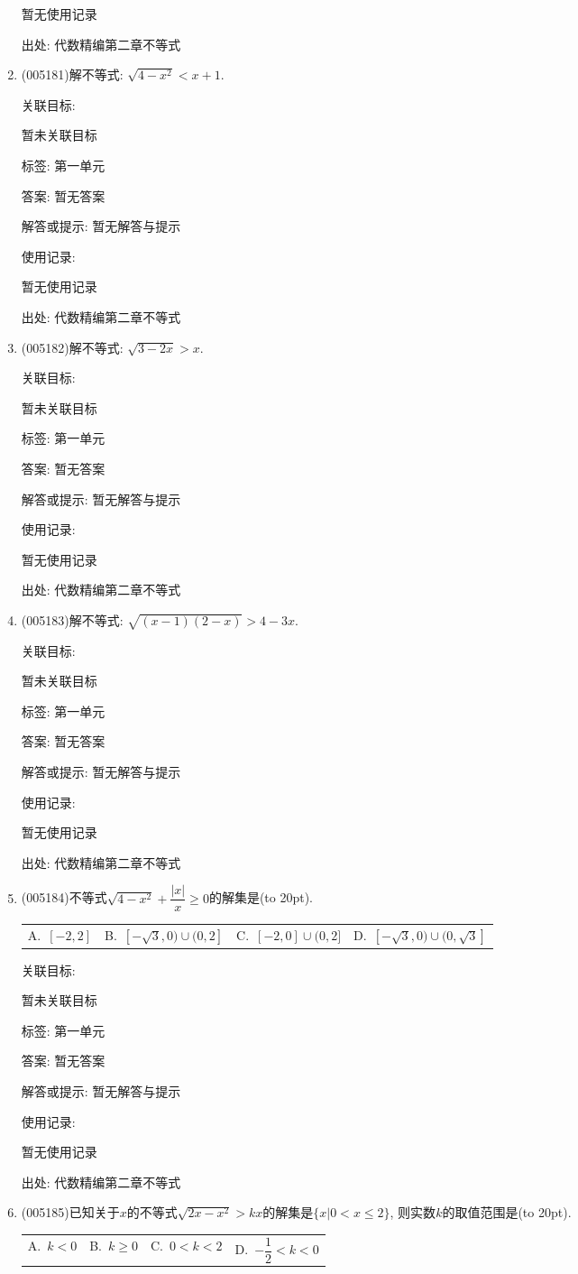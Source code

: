 \documentclass[10pt,a4paper]{article}
\newcommand{\bracket}[1]{(\hbox to #1pt{})}
\newcommand{\fourch}[4]{\par\begin{tabular}{p{.23\textwidth}p{.23\textwidth}p{.23\textwidth}p{.23\textwidth}}
A.~#1 &B.~#2& C.~#3& D.~#4
\end{tabular}}
\begin{document}
\begin{enumerate}[1.]
暂无使用记录


出处: 代数精编第二章不等式
\item { (005181)}解不等式: $\sqrt{4-x^2}<x+1$.


关联目标:

暂未关联目标



标签: 第一单元

答案: 暂无答案

解答或提示: 暂无解答与提示

使用记录:

暂无使用记录


出处: 代数精编第二章不等式
\item { (005182)}解不等式: $\sqrt{3-2x}>x$.


关联目标:

暂未关联目标



标签: 第一单元

答案: 暂无答案

解答或提示: 暂无解答与提示

使用记录:

暂无使用记录


出处: 代数精编第二章不等式
\item { (005183)}解不等式: $\sqrt{(x-1)(2-x)}>4-3x$.


关联目标:

暂未关联目标



标签: 第一单元

答案: 暂无答案

解答或提示: 暂无解答与提示

使用记录:

暂无使用记录


出处: 代数精编第二章不等式
\item { (005184)}不等式$\sqrt{4-x^2}+\dfrac{|x|}x\ge 0$的解集是\bracket{20}.
\fourch{$[-2,2]$}{$[-\sqrt 3,0)\cup (0,2]$}{$[-2,0]\cup (0,2]$}{$[-\sqrt 3,0)\cup (0,\sqrt 3]$}


关联目标:

暂未关联目标



标签: 第一单元

答案: 暂无答案

解答或提示: 暂无解答与提示

使用记录:

暂无使用记录


出处: 代数精编第二章不等式
\item { (005185)}已知关于$x$的不等式$\sqrt{2x-x^2}>kx$的解集是$\{x|0<x\le 2\}$, 则实数$k$的取值范围是\bracket{20}.
\fourch{$k<0$}{$k\ge 0$}{$0<k<2$}{$-\dfrac 12<k<0$}



\end{enumerate}
\end{document}
